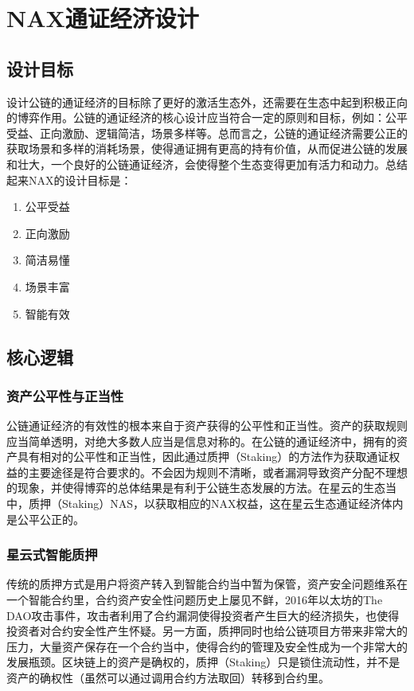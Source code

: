 \section{NAX通证经济设计}
\subsection{设计目标}
设计公链的通证经济的目标除了更好的激活生态外，还需要在生态中起到积极正向的博弈作用。公链的通证经济的核心设计应当符合一定的原则和目标，例如：公平受益、正向激励、逻辑简洁，场景多样等。总而言之，公链的通证经济需要公正的获取场景和多样的消耗场景，使得通证拥有更高的持有价值，从而促进公链的发展和壮大，一个良好的公链通证经济，会使得整个生态变得更加有活力和动力。总结起来NAX的设计目标是：

\begin{enumerate}[\hspace{2cm}(a)]
    \item 公平受益
    \item 正向激励
    \item 简洁易懂
    \item 场景丰富
    \item 智能有效
\end{enumerate}

\subsection{核心逻辑}

\subsubsection{资产公平性与正当性}
公链通证经济的有效性的根本来自于资产获得的公平性和正当性。资产的获取规则应当简单透明，对绝大多数人应当是信息对称的。在公链的通证经济中，拥有的资产具有相对的公平性和正当性，因此通过质押（Staking）的方法作为获取通证权益的主要途径是符合要求的。不会因为规则不清晰，或者漏洞导致资产分配不理想的现象，并使得博弈的总体结果是有利于公链生态发展的方法。在星云的生态当中，质押（Staking）NAS，以获取相应的NAX权益，这在星云生态通证经济体内是公平公正的。

\subsubsection{星云式智能质押}
传统的质押方式是用户将资产转入到智能合约当中暂为保管，资产安全问题维系在一个智能合约里，合约资产安全性问题历史上屡见不鲜，2016年以太坊的The DAO攻击事件，攻击者利用了合约漏洞使得投资者产生巨大的经济损失，也使得投资者对合约安全性产生怀疑。另一方面，质押同时也给公链项目方带来非常大的压力，大量资产保存在一个合约当中，使得合约的管理及安全性成为一个非常大的发展瓶颈。区块链上的资产是确权的，质押（Staking）只是锁住流动性，并不是资产的确权性（虽然可以通过调用合约方法取回）转移到合约里。

